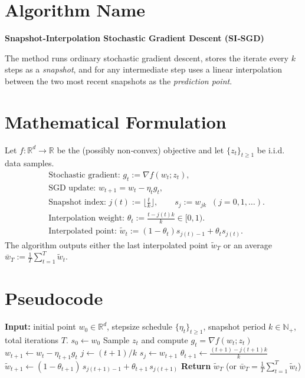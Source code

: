 \documentclass{article}
\newcommand{\R}{\mathbb{R}}
\begin{document}
\section*{Algorithm Name}
\textbf{Snapshot‑Interpolation Stochastic Gradient Descent (SI‑SGD)}  

The method runs ordinary stochastic gradient descent, stores the iterate every $k$ steps as a \emph{snapshot}, and for any intermediate step uses a linear interpolation between the two most recent snapshots as the \emph{prediction point}.

\section*{Mathematical Formulation}
Let $f:\R^{d}\rightarrow\R$ be the (possibly non‑convex) objective and let $\{z_t\}_{t\ge 1}$ be i.i.d. data samples.
\begin{align}
    &\text{Stochastic gradient: } g_t := \nabla f(w_t;z_t),                         \label{eq:stochgrad}\\
    &\text{SGD update: }      w_{t+1}= w_t-\eta_t g_t,                               \label{eq:sgdupdate}\\
    &\text{Snapshot index: }   j(t):=\Big\lfloor\frac{t}{k}\Big\rfloor, \qquad 
      s_j := w_{jk}\;\;(j=0,1,\dots).                                                \label{eq:snapshot}\\
    &\text{Interpolation weight: } \theta_t :=\frac{t-j(t)k}{k}\in[0,1).           \label{eq:theta}\\
    &\text{Interpolated point: } \tilde w_t := (1-\theta_t)s_{j(t)-1}+\theta_t s_{j(t)}.
      \label{eq:interp}
\end{align}
The algorithm outputs either the last interpolated point $\tilde w_T$ or an average
$\bar w_T:=\frac1T\sum_{t=1}^T\tilde w_t$.

\section*{Pseudocode}
\begin{algorithm}[H]
\caption{Snapshot‑Interpolation SGD (SI‑SGD)}
\begin{algorithmic}[1]
\State \textbf{Input:} initial point $w_0\in\R^d$, stepsize schedule $\{\eta_t\}_{t\ge1}$, snapshot period $k\in\mathbb{N}_{+}$, total iterations $T$.
\State $s_{0}\gets w_0$ 
    \State Sample $z_t$ and compute $g_t=\nabla f(w_t;z_t)$
    \State $w_{t+1}\gets w_t-\eta_{t+1}g_t$                         
        \State $j\gets (t+1)/k$                                    
        \State $s_{j}\gets w_{t+1}$                               
    \EndIf
    \State $\theta_{t+1}\gets\frac{(t+1)-j(t+1)k}{k}$               
    \State $\tilde w_{t+1}\gets (1-\theta_{t+1})\,s_{j(t+1)-1}+\theta_{t+1}\,s_{j(t+1)}$
\EndFor
\State \textbf{Return} $\tilde w_T$ (or $\bar w_T=\frac1T\sum_{t=1}^T\tilde w_t$)
\end{algorithmic}
\end{algorithm}
\end{document}

